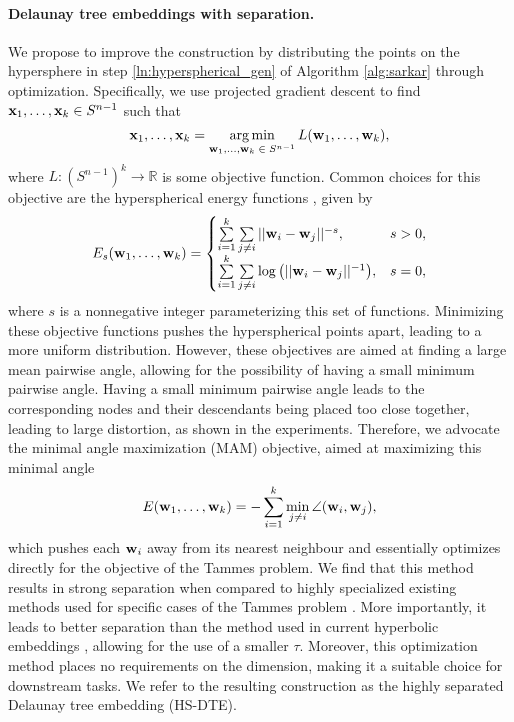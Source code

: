 \vspace{-0.2cm}

\paragraph{Delaunay tree embeddings with separation.}
We propose to improve the construction by distributing the points on the hypersphere in step \ref{ln:hyperspherical_gen} of Algorithm \ref{alg:sarkar} through optimization. Specifically, we use projected gradient descent to find $\mathbf{x}_1, \ldots, \mathbf{x}_k \in S^{n - 1}$ such that
\begin{equation}
    \mathbf{x}_1, \ldots, \mathbf{x}_k = \operatorname*{arg\,min}_{\mathbf{w}_1, \ldots, \mathbf{w}_k \; \in \; S^{n - 1}} L (\mathbf{w}_1, \ldots, \mathbf{w}_k),
\end{equation}
where $L: (S^{n-1})^{k} \rightarrow \mathbb{R}$ is some objective function. Common choices for this objective are the hyperspherical energy functions \citep{liu2018learning}, given by
\begin{equation}
    E_{s} (\mathbf{w}_1, \dots, \mathbf{w}_k) = 
    \begin{cases}
        \sum\limits_{i = 1}^k \sum\limits_{j \neq i} ||\mathbf{w}_i - \mathbf{w}_j||^{-s}, & s > 0, \\
        \sum\limits_{i = 1}^k \sum\limits_{j \neq i} \log\big( ||\mathbf{w}_i - \mathbf{w}_j||^{-1} \big), & s = 0,
    \end{cases}
\end{equation}
where $s$ is a nonnegative integer parameterizing this set of functions. Minimizing these objective functions pushes the hyperspherical points apart, leading to a more uniform distribution. However, these objectives are aimed at finding a large mean pairwise angle, allowing for the possibility of having a small minimum pairwise angle. Having a small minimum pairwise angle leads to the corresponding nodes and their descendants being placed too close together, leading to large distortion, as shown in the experiments. Therefore, we advocate the minimal angle maximization (MAM) objective, aimed at maximizing this minimal angle
\begin{equation}
    E(\mathbf{w}_1, \ldots, \mathbf{w}_k) = - \sum_{i = 1}^k \min_{j \neq i} \angle(\mathbf{w}_i, \mathbf{w}_j),
\end{equation}
which pushes each $\mathbf{w}_i$ away from its nearest neighbour and essentially optimizes directly for the objective of the Tammes problem. We find that this method results in strong separation when compared to highly specialized existing methods used for specific cases of the Tammes problem \citep{cohn2024spherical}. More importantly, it leads to better separation than the method used in current hyperbolic embeddings \citep{sala2018representation}, allowing for the use of a smaller $\tau$. Moreover, this optimization method places no requirements on the dimension, making it a suitable choice for downstream tasks. We refer to the resulting construction as the highly separated Delaunay tree embedding (HS-DTE).

